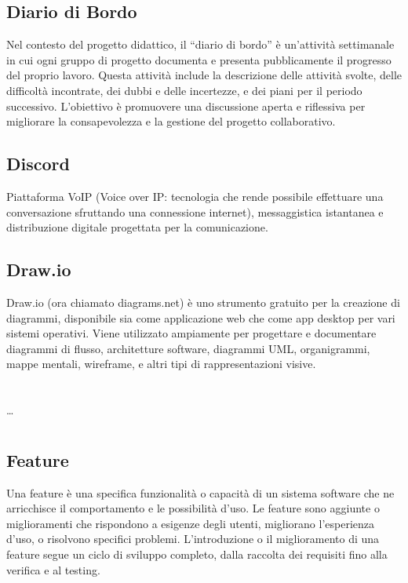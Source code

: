 \hypertarget{sec:diario_di_bordo}{}
\subsection*{Diario di Bordo}
Nel contesto del progetto didattico, il “diario di bordo” è un’attività settimanale in cui ogni gruppo di progetto documenta e presenta pubblicamente il progresso del proprio lavoro. 
Questa attività include la descrizione delle attività svolte, delle difficoltà incontrate, dei dubbi e delle incertezze, e dei piani per il periodo successivo. 
L’obiettivo è promuovere una discussione aperta e riflessiva per migliorare la consapevolezza e la gestione del progetto collaborativo.

\subsection*{Discord}
Piattaforma VoIP (Voice over IP: tecnologia che rende possibile effettuare una conversazione sfruttando una connessione internet), messaggistica istantanea 
e distribuzione digitale progettata per la comunicazione.

\subsection*{Draw.io}
Draw.io (ora chiamato diagrams.net) è uno strumento gratuito per la creazione di diagrammi, disponibile sia come applicazione web che come app desktop per 
vari sistemi operativi. Viene utilizzato ampiamente per progettare e documentare diagrammi di flusso, architetture software, diagrammi UML, organigrammi, 
mappe mentali, wireframe, e altri tipi di rappresentazioni visive.

\newpage



\section{}

\dots

\newpage



\section{}

\hypertarget{sec:feature}{}
\subsection*{Feature}
Una feature è una specifica funzionalità o capacità di un sistema software che ne arricchisce il comportamento e le possibilità d'uso. Le feature sono 
aggiunte o miglioramenti che rispondono a esigenze degli utenti, migliorano l’esperienza d’uso, o risolvono specifici problemi. L'introduzione o il 
miglioramento di una feature segue un ciclo di sviluppo completo, dalla raccolta dei requisiti fino alla verifica e al testing.

